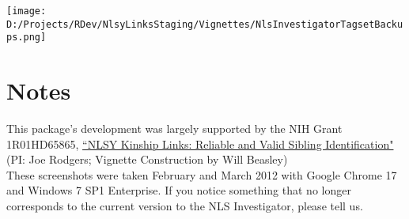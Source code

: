\documentclass{article}\usepackage[]{graphicx}\usepackage[]{color}
\begin{document}
\texttt{[image: D:/Projects/RDev/NlsyLinksStaging/Vignettes/NlsInvestigatorTagsetBackups.png]}

\section{Notes}
This package's development was largely supported by the NIH Grant 1R01HD65865, \href{http://taggs.hhs.gov/AwardDetail.cfm?s_Award_Num=R01HD065865&n_Prog_Office_Code=50}{``NLSY Kinship Links: Reliable and Valid Sibling Identification"} (PI: Joe Rodgers; Vignette Construction by Will Beasley)\\


These screenshots were taken February and March 2012 with Google Chrome 17 and Windows 7 SP1 Enterprise.  If you notice something that no longer corresponds to the current version to the NLS Investigator, please tell us.
\end{document}
